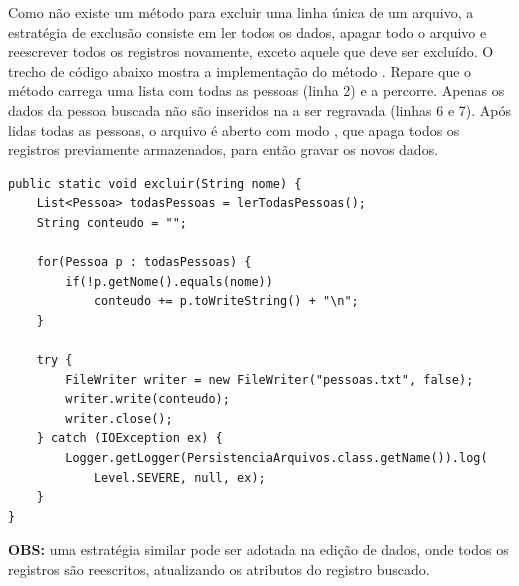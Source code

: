 Como não existe um método para excluir uma linha única de um arquivo, a estratégia de exclusão consiste em ler todos os dados, apagar todo o arquivo e reescrever todos os registros novamente, exceto aquele que deve ser excluído. O trecho de código abaixo mostra a implementação do método . Repare que o método carrega uma lista com todas as pessoas (linha 2) e a percorre. Apenas os dados da pessoa buscada não são inseridos na  a ser regravada (linhas 6 e 7). Após lidas todas as pessoas, o arquivo é aberto com modo , que apaga todos os registros previamente armazenados, para então gravar os novos dados.

\begin{verbatim}
public static void excluir(String nome) {
	List<Pessoa> todasPessoas = lerTodasPessoas();
	String conteudo = "";

	for(Pessoa p : todasPessoas) {
		if(!p.getNome().equals(nome))
			conteudo += p.toWriteString() + "\n";
	}

	try {
		FileWriter writer = new FileWriter("pessoas.txt", false);
		writer.write(conteudo);
		writer.close();
	} catch (IOException ex) {
		Logger.getLogger(PersistenciaArquivos.class.getName()).log(
			Level.SEVERE, null, ex);
	}
}
\end{verbatim}

\textbf{OBS:} uma estratégia similar pode ser adotada na edição de dados, onde todos os registros são reescritos, atualizando os atributos do registro buscado.